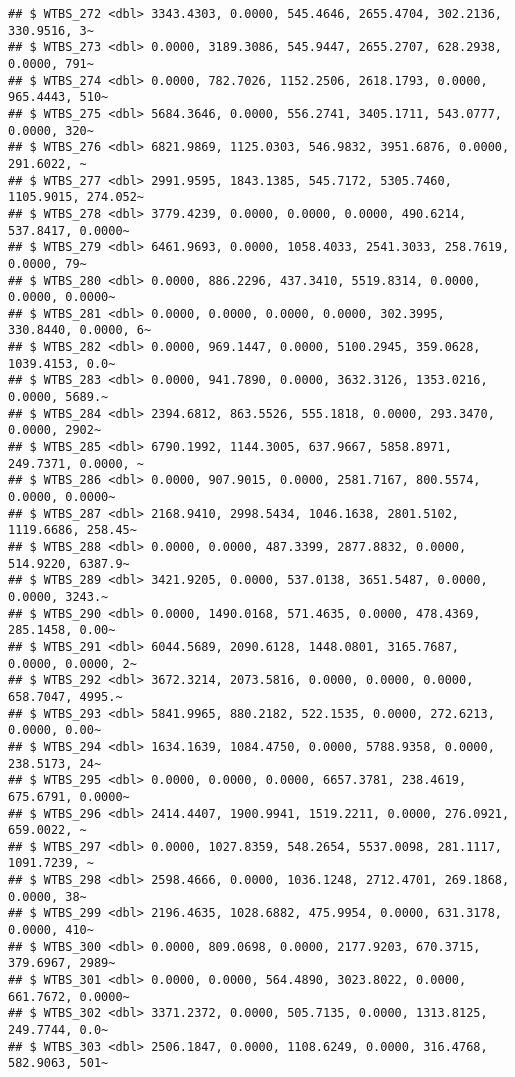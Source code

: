 \documentclass[
]{article}
\begin{document}
\begin{verbatim}
## $ WTBS_272 <dbl> 3343.4303, 0.0000, 545.4646, 2655.4704, 302.2136, 330.9516, 3~
## $ WTBS_273 <dbl> 0.0000, 3189.3086, 545.9447, 2655.2707, 628.2938, 0.0000, 791~
## $ WTBS_274 <dbl> 0.0000, 782.7026, 1152.2506, 2618.1793, 0.0000, 965.4443, 510~
## $ WTBS_275 <dbl> 5684.3646, 0.0000, 556.2741, 3405.1711, 543.0777, 0.0000, 320~
## $ WTBS_276 <dbl> 6821.9869, 1125.0303, 546.9832, 3951.6876, 0.0000, 291.6022, ~
## $ WTBS_277 <dbl> 2991.9595, 1843.1385, 545.7172, 5305.7460, 1105.9015, 274.052~
## $ WTBS_278 <dbl> 3779.4239, 0.0000, 0.0000, 0.0000, 490.6214, 537.8417, 0.0000~
## $ WTBS_279 <dbl> 6461.9693, 0.0000, 1058.4033, 2541.3033, 258.7619, 0.0000, 79~
## $ WTBS_280 <dbl> 0.0000, 886.2296, 437.3410, 5519.8314, 0.0000, 0.0000, 0.0000~
## $ WTBS_281 <dbl> 0.0000, 0.0000, 0.0000, 0.0000, 302.3995, 330.8440, 0.0000, 6~
## $ WTBS_282 <dbl> 0.0000, 969.1447, 0.0000, 5100.2945, 359.0628, 1039.4153, 0.0~
## $ WTBS_283 <dbl> 0.0000, 941.7890, 0.0000, 3632.3126, 1353.0216, 0.0000, 5689.~
## $ WTBS_284 <dbl> 2394.6812, 863.5526, 555.1818, 0.0000, 293.3470, 0.0000, 2902~
## $ WTBS_285 <dbl> 6790.1992, 1144.3005, 637.9667, 5858.8971, 249.7371, 0.0000, ~
## $ WTBS_286 <dbl> 0.0000, 907.9015, 0.0000, 2581.7167, 800.5574, 0.0000, 0.0000~
## $ WTBS_287 <dbl> 2168.9410, 2998.5434, 1046.1638, 2801.5102, 1119.6686, 258.45~
## $ WTBS_288 <dbl> 0.0000, 0.0000, 487.3399, 2877.8832, 0.0000, 514.9220, 6387.9~
## $ WTBS_289 <dbl> 3421.9205, 0.0000, 537.0138, 3651.5487, 0.0000, 0.0000, 3243.~
## $ WTBS_290 <dbl> 0.0000, 1490.0168, 571.4635, 0.0000, 478.4369, 285.1458, 0.00~
## $ WTBS_291 <dbl> 6044.5689, 2090.6128, 1448.0801, 3165.7687, 0.0000, 0.0000, 2~
## $ WTBS_292 <dbl> 3672.3214, 2073.5816, 0.0000, 0.0000, 0.0000, 658.7047, 4995.~
## $ WTBS_293 <dbl> 5841.9965, 880.2182, 522.1535, 0.0000, 272.6213, 0.0000, 0.00~
## $ WTBS_294 <dbl> 1634.1639, 1084.4750, 0.0000, 5788.9358, 0.0000, 238.5173, 24~
## $ WTBS_295 <dbl> 0.0000, 0.0000, 0.0000, 6657.3781, 238.4619, 675.6791, 0.0000~
## $ WTBS_296 <dbl> 2414.4407, 1900.9941, 1519.2211, 0.0000, 276.0921, 659.0022, ~
## $ WTBS_297 <dbl> 0.0000, 1027.8359, 548.2654, 5537.0098, 281.1117, 1091.7239, ~
## $ WTBS_298 <dbl> 2598.4666, 0.0000, 1036.1248, 2712.4701, 269.1868, 0.0000, 38~
## $ WTBS_299 <dbl> 2196.4635, 1028.6882, 475.9954, 0.0000, 631.3178, 0.0000, 410~
## $ WTBS_300 <dbl> 0.0000, 809.0698, 0.0000, 2177.9203, 670.3715, 379.6967, 2989~
## $ WTBS_301 <dbl> 0.0000, 0.0000, 564.4890, 3023.8022, 0.0000, 661.7672, 0.0000~
## $ WTBS_302 <dbl> 3371.2372, 0.0000, 505.7135, 0.0000, 1313.8125, 249.7744, 0.0~
## $ WTBS_303 <dbl> 2506.1847, 0.0000, 1108.6249, 0.0000, 316.4768, 582.9063, 501~

\end{verbatim}
\end{document}
